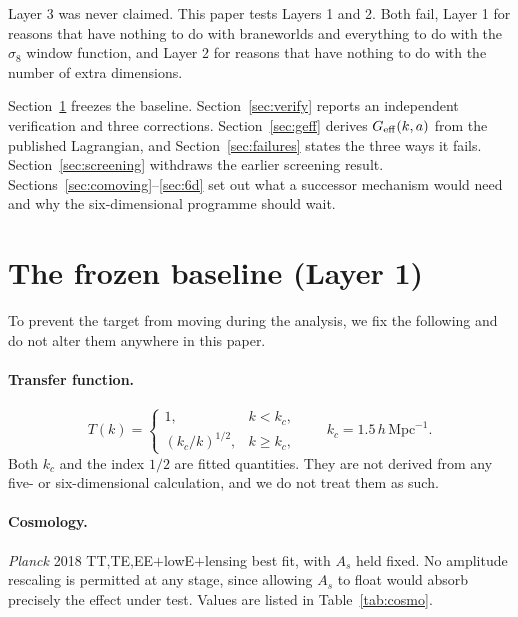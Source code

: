 \documentclass[11pt,a4paper]{article}
\newcommand{\hMpc}{h\,\mathrm{Mpc}^{-1}}
\newcommand{\Geff}{G_{\rm eff}}
\begin{document}
\noindent
Layer 3 was never claimed. This paper tests Layers 1 and 2. Both fail, Layer 1 for
reasons that have nothing to do with braneworlds and everything to do with the
$\sigma_8$ window function, and Layer 2 for reasons that have nothing to do with the
number of extra dimensions.

Section~\ref{sec:baseline} freezes the baseline. Section~\ref{sec:verify} reports an
independent verification and three corrections. Section~\ref{sec:geff} derives
$\Geff(k,a)$ from the published Lagrangian, and Section~\ref{sec:failures} states the
three ways it fails. Section~\ref{sec:screening} withdraws the earlier screening
result. Sections~\ref{sec:comoving}--\ref{sec:6d} set out what a successor mechanism
would need and why the six-dimensional programme should wait.

\section{The frozen baseline (Layer 1)}\label{sec:baseline}

To prevent the target from moving during the analysis, we fix the following and do
not alter them anywhere in this paper.

\paragraph{Transfer function.}
\begin{equation}
T(k)=
\begin{cases}
1, & k<k_c,\\[2pt]
\left(k_c/k\right)^{1/2}, & k\ge k_c,
\end{cases}
\qquad k_c = 1.5\,\hMpc .
\label{eq:Tk}
\end{equation}
Both $k_c$ and the index $1/2$ are fitted quantities. They are not derived from any
five- or six-dimensional calculation, and we do not treat them as such.

\paragraph{Cosmology.} \emph{Planck} 2018 TT,TE,EE$+$lowE$+$lensing best fit, with
$A_s$ held fixed. No amplitude rescaling is permitted at any stage, since allowing
$A_s$ to float would absorb precisely the effect under test. Values are listed in
Table~\ref{tab:cosmo}.
\end{document}
